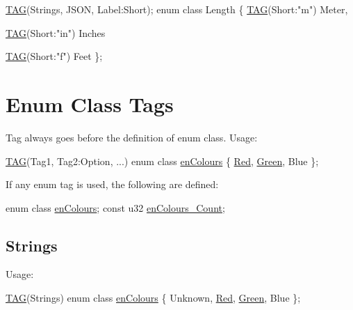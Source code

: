 \begin{DoxyCode}
\hyperlink{PreprocTest_8h_a2606cd56d2d8f567785bde5848176722}{TAG}(Strings, JSON, Label:Short);
\textcolor{keyword}{enum class} Length
\{   
    \hyperlink{PreprocTest_8h_a2606cd56d2d8f567785bde5848176722}{TAG}(Short:\textcolor{stringliteral}{"m"})
    Meter,

    \hyperlink{PreprocTest_8h_a2606cd56d2d8f567785bde5848176722}{TAG}(Short:\textcolor{stringliteral}{"in"})
    Inches

    \hyperlink{PreprocTest_8h_a2606cd56d2d8f567785bde5848176722}{TAG}(Short:\textcolor{stringliteral}{"f"})
    Feet
\};
\end{DoxyCode}
\hypertarget{index_autotoc_md8}{}\section{Enum Class Tags}\label{index_autotoc_md8}
Tag always goes before the definition of {\ttfamily enum class}. Usage\+: 
\begin{DoxyCode}
\hyperlink{PreprocTest_8h_a2606cd56d2d8f567785bde5848176722}{TAG}(Tag1, Tag2:Option, ...)
enum class \hyperlink{PreprocTest_8h_a081cf1a0e70d6e2bd48c98f457742877}{enColours}
\{
    \hyperlink{PreprocTest_8h_a081cf1a0e70d6e2bd48c98f457742877aee38e4d5dd68c4e440825018d549cb47}{Red},
    \hyperlink{PreprocTest_8h_a081cf1a0e70d6e2bd48c98f457742877ad382816a3cbeed082c9e216e7392eed1}{Green},
    Blue
\};
\end{DoxyCode}


If any enum tag is used, the following are defined\+: 
\begin{DoxyCode}
\textcolor{keyword}{enum class} \hyperlink{PreprocTest_8h_a081cf1a0e70d6e2bd48c98f457742877}{enColours};
\textcolor{keyword}{const} u32 \hyperlink{Generated__Test_8h_abd85a89ac29df78a4d1b078c54016c79}{enColours\_Count};
\end{DoxyCode}
\hypertarget{index_autotoc_md9}{}\subsection{Strings}\label{index_autotoc_md9}
Usage\+: 
\begin{DoxyCode}
\hyperlink{PreprocTest_8h_a2606cd56d2d8f567785bde5848176722}{TAG}(Strings)
\textcolor{keyword}{enum class} \hyperlink{PreprocTest_8h_a081cf1a0e70d6e2bd48c98f457742877}{enColours}
\{
    Unknown,
    \hyperlink{PreprocTest_8h_a081cf1a0e70d6e2bd48c98f457742877aee38e4d5dd68c4e440825018d549cb47}{Red},
    \hyperlink{PreprocTest_8h_a081cf1a0e70d6e2bd48c98f457742877ad382816a3cbeed082c9e216e7392eed1}{Green},
    Blue
\};
\end{DoxyCode}


